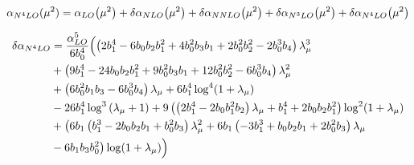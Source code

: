 \documentclass[../main.tex]{subfiles}
\begin{document}
\begin{equation}\label{eq:N4LO}
    \alpha_{N^4LO}(\mu^2) = \alpha_{LO}\qty(\mu^2) + \delta\alpha_{NLO}\qty(\mu^2)+\delta\alpha_{NNLO}\qty(\mu^2)+\delta\alpha_{N^3LO}\qty(\mu^2) + \delta\alpha_{N^4LO}\qty(\mu^2)
\end{equation}

\begin{equation}\label{eq:DN4LO}
    \begin{split}
        \delta\alpha_{N^4LO} &= \frac{\alpha_{LO}^5}{6 b_0^4} \Bigl( \left(2 b_1^4-6 b_0 b_2 b_1^2+4 b_0^2 b_3 b_1 + 2 b_0^2 b_2^2-2 b_0^3 b_4 \right) \lambda _{\mu}^3 \\
        &+ \left( 9 b_1^4-24 b_0 b_2 b_1^2+9 b_0^2 b_3 b_1+12 b_0^2 b_2^2-6 b_0^3 b_4\right) \lambda_{\mu}^2 \\
        &+ \left(6 b_0^2 b_1 b_3-6 b_0^3 b_4\right) \lambda_{\mu} + 6 b_1^4 \log ^4(1+ \lambda_{\mu})\\
        &- 26 b_1^4 \log ^3\left(\lambda _{\mu }+1\right)+9 \left(\left(2 b_1^4-2 b_0 b_1^2 b_2\right) \lambda _{\mu } + b_1^4+2 b_0 b_2 b_1^2\right) \log ^2(1+\lambda _{\mu})\\
        &+ \bigl(6 b_1 \left(b_1^3-2 b_0 b_2 b_1+b_0^2 b_3\right) \lambda _{\mu }^2
        + 6 b_1 \left(-3 b_1^3+b_0 b_2 b_1+2 b_0^2 b_3\right) \lambda_{\mu}\\
        &- 6 b_1 b_3 b_0^2 \bigr) \log(1+\lambda _{\mu }) \Bigr)
    \end{split}
\end{equation}
\end{document}
